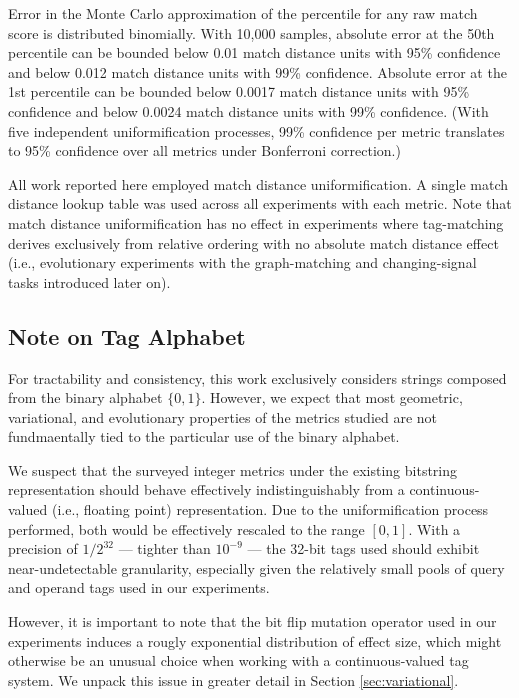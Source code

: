 Error in the Monte Carlo approximation of the percentile for any raw match score is distributed binomially.
With 10,000 samples, absolute error at the 50th percentile can be bounded below 0.01 match distance units with 95\% confidence and below 0.012 match distance units with 99\% confidence.
Absolute error at the 1st percentile can be bounded below 0.0017 match distance units with 95\% confidence and below 0.0024 match distance units with 99\% confidence.
(With five independent uniformification processes, 99\% confidence per metric translates to 95\% confidence over all metrics under Bonferroni correction.)

All work reported here employed match distance uniformification.
A single match distance lookup table was used across all experiments with each metric.
Note that match distance uniformification has no effect in experiments where tag-matching derives exclusively from relative ordering with no absolute match distance effect (i.e., evolutionary experiments with the graph-matching and changing-signal tasks introduced later on).

\subsection{Note on Tag Alphabet}

For tractability and consistency, this work exclusively considers strings composed from the binary alphabet $\{0, 1\}$.
However, we expect that most geometric, variational, and evolutionary properties of the metrics studied are not fundmaentally tied to the particular use of the binary alphabet.

We suspect that the surveyed integer metrics under the existing bitstring representation should behave effectively indistinguishably from a continuous-valued (i.e., floating point) representation.
Due to the uniformification process performed, both would be effectively rescaled to the range $[0, 1]$.
With a precision of $1/2^{32}$ --- tighter than $10^{-9}$ --- the 32-bit tags used should exhibit near-undetectable granularity, especially given the relatively small pools of query and operand tags used in our experiments.

However, it is important to note that the bit flip mutation operator used in our experiments induces a rougly exponential distribution of effect size, which might otherwise be an unusual choice when working with a continuous-valued tag system.
We unpack this issue in greater detail in Section \ref{sec:variational}.

